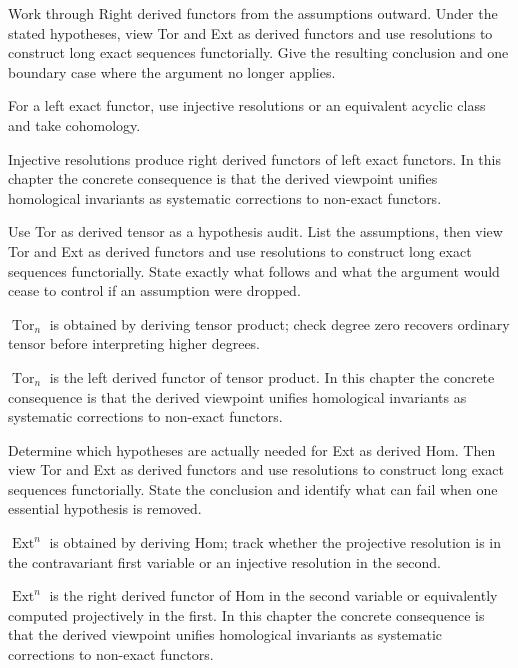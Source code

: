 \begin{exercise}\label{exr:v28-03}
Work through Right derived functors from the assumptions outward. Under the stated hypotheses, view Tor and Ext as derived functors and use resolutions to construct long exact sequences functorially. Give the resulting conclusion and one boundary case where the argument no longer applies.
\end{exercise}
\begin{hint}
For a left exact functor, use injective resolutions or an equivalent acyclic class and take cohomology.
\end{hint}
\begin{solution}
Injective resolutions produce right derived functors of left exact functors. In this chapter the concrete consequence is that the derived viewpoint unifies homological invariants as systematic corrections to non-exact functors.
\end{solution}

\begin{exercise}\label{exr:v28-04}
Use Tor as derived tensor as a hypothesis audit. List the assumptions, then view Tor and Ext as derived functors and use resolutions to construct long exact sequences functorially. State exactly what follows and what the argument would cease to control if an assumption were dropped.
\end{exercise}
\begin{hint}
\(\operatorname{Tor}_n\) is obtained by deriving tensor product; check degree zero recovers ordinary tensor before interpreting higher degrees.
\end{hint}
\begin{solution}
$\operatorname{Tor}_n$ is the left derived functor of tensor product. In this chapter the concrete consequence is that the derived viewpoint unifies homological invariants as systematic corrections to non-exact functors.
\end{solution}

\begin{exercise}\label{exr:v28-05}
Determine which hypotheses are actually needed for Ext as derived Hom. Then view Tor and Ext as derived functors and use resolutions to construct long exact sequences functorially. State the conclusion and identify what can fail when one essential hypothesis is removed.
\end{exercise}
\begin{hint}
\(\operatorname{Ext}^n\) is obtained by deriving Hom; track whether the projective resolution is in the contravariant first variable or an injective resolution in the second.
\end{hint}
\begin{solution}
$\operatorname{Ext}^n$ is the right derived functor of Hom in the second variable or equivalently computed projectively in the first. In this chapter the concrete consequence is that the derived viewpoint unifies homological invariants as systematic corrections to non-exact functors.
\end{solution}

